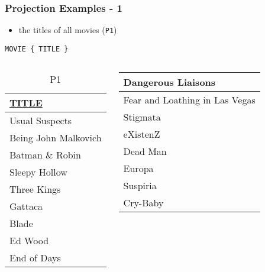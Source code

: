 \documentclass[dvipsnames]{beamer}
\theoremstyle{plain}
\begin{document}
\begin{frame}[fragile]
  \frametitle{Projection Examples - 1}

  \begin{example}
    \begin{itemize}
      \item the titles of all movies (\texttt{P1})
    \end{itemize}

    \begin{lstlisting}
MOVIE { TITLE }
    \end{lstlisting}

    \pause
    \vspace{-10pt}
    \begin{columns}[b]
      \begin{tiny}
      \begin{table}
        \caption{P1}
        \begin{tabular}{|l|}\hline
\underline{TITLE}             \\[2pt]\hline\hline
Usual Suspects                \\\hline
Being John Malkovich          \\\hline
Batman \& Robin               \\\hline
Sleepy Hollow                 \\\hline
Three Kings                   \\\hline
Gattaca                       \\\hline
Blade                         \\\hline
Ed Wood                       \\\hline
End of Days                   \\\hline
        \end{tabular}
      \end{table}
      \end{tiny}

      \begin{tiny}
      \begin{table}
        \begin{tabular}{|l|}\hline
Dangerous Liaisons            \\\hline
Fear and Loathing in Las Vegas\\\hline
Stigmata                      \\\hline
eXistenZ                      \\\hline
Dead Man                      \\\hline
Europa                        \\\hline
Suspiria                      \\\hline
Cry-Baby                      \\\hline
        \end{tabular}
      \end{table}
      \end{tiny}
    \end{columns}
  \end{example}
\end{frame}
\end{document}
